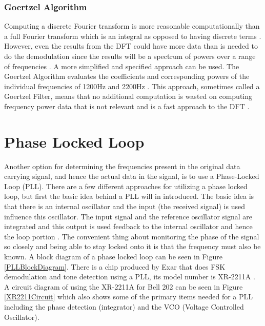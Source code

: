 \subsubsection{Goertzel Algorithm}
Computing a discrete Fourier transform is more reasonable computationally than a full Fourier transform which is an integral as opposed to having discrete terms \cite{WikipediaFT}. However, even the results from the DFT could have more data than is needed to do the demodulation since the results will be a spectrum of powers over a range of frequencies \cite{WikipediaDFT,WikipediaFFT}. A more simplified and specified approach can be used. The Goertzel Algorithm evaluates the coefficients and corresponding powers of the individual frequencies of 1200Hz and 2200Hz \cite{WikipediaGA,Elmenreich2011}. This approach, sometimes called a Goertzel Filter, means that no additional computation is wasted on computing frequency power data that is not relevant and is a fast approach to the DFT \cite{SanjitK1993}.

\section{Phase Locked Loop}
Another option for determining the frequencies present in the original data carrying signal, and hence the actual data in the signal, is to use a Phase-Locked Loop (PLL). There are a few different approaches for utilizing a phase locked loop, but first the basic idea behind a PLL will in introduced. The basic idea is that there is an internal oscillator and the input (the received signal) is used influence this oscillator. The input signal and the reference oscillator signal are integrated and this output is used feedback to the internal oscillator and hence the loop portion \cite{Roppel}. The convenient thing about monitoring the phase of the signal so closely and being able to stay locked onto it is that the frequency must also be known. A block diagram of a phase locked loop can be seen in Figure \ref{PLLBlockDiagram}. There is a chip produced by Exar that does FSK demodulation and tone detection using a PLL, its model number is XR-2211A \cite{EXAR1997}. A circuit diagram of using the XR-2211A for Bell 202 can be seen in Figure \ref{XR2211Circuit} which also shows some of the primary items needed for a PLL including the phase detection (integrator) and the VCO (Voltage Controlled Oscillator).

